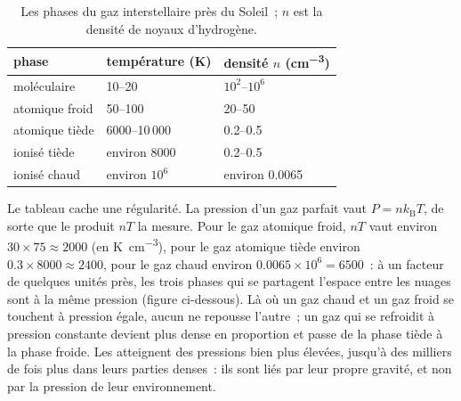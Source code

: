 \begin{table}[htbp]
\centering
\small
\begin{tabular}{lll}
\hline
phase & température (K) & densité $n$ (\unit{cm^{-3}}) \\
\hline
moléculaire & 10--20 & $10^2$--$10^6$ \\
atomique froid & 50--100 & 20--50 \\
atomique tiède & 6000--10\,000 & 0.2--0.5 \\
ionisé tiède & environ 8000 & 0.2--0.5 \\
ionisé chaud & environ $10^6$ & environ 0.0065 \\
\hline
\end{tabular}
\caption{Les phases du gaz interstellaire près du Soleil~; $n$ est la densité
de noyaux d'hydrogène.}
\label{tab:b2:ism-star-formation:phases}
\end{table}

Le tableau cache une régularité. La pression d'un gaz parfait vaut
$P = n k_{\mathrm B} T$, de sorte que le produit $nT$ la mesure. Pour le gaz atomique froid, $nT$ vaut environ $30\times75 \approx 2000$ (en \unit{K.cm^{-3}}),
pour le gaz atomique tiède environ $0.3\times8000 \approx 2400$, pour le gaz chaud environ $0.0065\times10^6 = 6500$~: à un facteur de quelques unités près, les trois phases qui se partagent l'espace entre les nuages sont à la même pression (figure
ci-dessous). Là où un gaz chaud et un gaz froid se touchent à pression égale, aucun ne repousse l'autre~; un gaz qui se refroidit à pression constante devient plus dense en proportion et passe de la phase tiède à la phase froide. Les  atteignent des pressions bien plus élevées, jusqu'à des milliers de
fois plus dans leurs parties denses~: ils sont liés par leur propre gravité, et non par
la
pression
de
leur
environnement.

